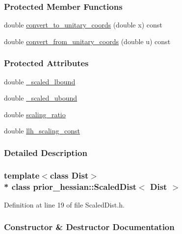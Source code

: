 \subsubsection*{Protected Member Functions}
\begin{DoxyCompactItemize}
\item 
double \hyperlink{classprior__hessian_1_1ScaledDist_a8c264d2bf6cd034653972de02add2b46}{convert\+\_\+to\+\_\+unitary\+\_\+coords} (double x) const 
\item 
double \hyperlink{classprior__hessian_1_1ScaledDist_a99eca9762537a354b6d2b1b0e26e1f01}{convert\+\_\+from\+\_\+unitary\+\_\+coords} (double u) const 
\end{DoxyCompactItemize}
\subsubsection*{Protected Attributes}
\begin{DoxyCompactItemize}
\item 
double \hyperlink{classprior__hessian_1_1ScaledDist_ab513c292e58fb1b691e8a0c48e3709fb}{\+\_\+scaled\+\_\+lbound}
\item 
double \hyperlink{classprior__hessian_1_1ScaledDist_a98811d53e6f78eae86ec88afc322baa2}{\+\_\+scaled\+\_\+ubound}
\item 
double \hyperlink{classprior__hessian_1_1ScaledDist_a27f94c682e78e310b0820008d723fa95}{scaling\+\_\+ratio}
\item 
double \hyperlink{classprior__hessian_1_1ScaledDist_a6aeaf23b5868bdb9afcbd944e05f68d3}{llh\+\_\+scaling\+\_\+const}
\end{DoxyCompactItemize}


\subsubsection{Detailed Description}
\subsubsection*{template$<$class Dist$>$\\*
class prior\+\_\+hessian\+::\+Scaled\+Dist$<$ Dist $>$}



Definition at line 19 of file Scaled\+Dist.\+h.



\subsubsection{Constructor \& Destructor Documentation}
